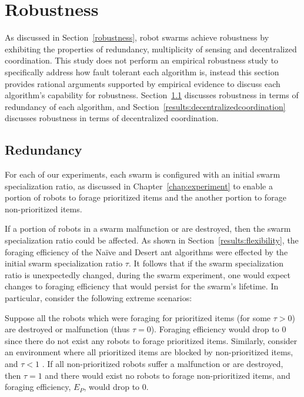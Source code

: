 \section{Robustness}
\label{results:robustness}
As discussed in Section~\ref{robustness}, robot swarms achieve robustness by exhibiting the properties of redundancy, multiplicity of sensing and decentralized coordination. This study does not perform an empirical robustness study to specifically address how fault tolerant each algorithm is, instead this section provides rational arguments supported by empirical evidence to discuss each  algorithm's capability for robustness. Section~\ref{results:redundancy} discusses robustness in terms of redundancy of each algorithm, and Section~\ref{results:decentralizedcoordination} discusses robustness in terms of decentralized coordination.

\subsection{Redundancy}
\label{results:redundancy}
For each of our experiments, each swarm is configured with an initial swarm specialization ratio, as discussed in Chapter~\ref{chap:experiment} to enable a portion of robots to forage prioritized items and the another portion to forage non-prioritized items. 

If a portion of robots in a swarm malfunction or are destroyed, then the swarm specialization ratio could be affected. As shown in Section~\ref{results:flexibility}, the foraging efficiency of the Na\"ive and Desert ant algorithms were effected by the initial swarm specialization ratio $\tau$. It follows that if the swarm specialization ratio is unexpectedly changed, during the swarm experiment, one would expect changes to foraging efficiency that would persist for the swarm's lifetime. In particular, consider the following extreme scenarios: 

Suppose all the robots which were foraging for prioritized items (for some $\tau > 0$) are destroyed or malfunction (thus $\tau=0$). Foraging efficiency would drop to 0 since there do not exist any robots to forage prioritized items. Similarly, consider an environment where all prioritized items are blocked by non-prioritized items, and $\tau < 1$ . If all non-prioritized robots suffer a malfunction or are destroyed, then $\tau=1$ and there would exist no robots to forage non-prioritized items, and foraging efficiency, $E_P$, would drop to 0. 


